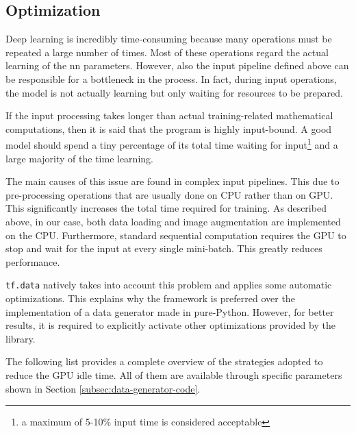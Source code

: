\subsection{Optimization}

Deep learning is incredibly time-consuming because many operations must be repeated a large number of times. Most of these operations regard the actual learning of the \gls{nn} parameters. However, also the input pipeline defined above can be responsible for a bottleneck in the process. In fact, during input operations, the model is not actually learning but only waiting for resources to be prepared.

If the input processing takes longer than actual training-related mathematical computations, then it is said that the program is highly input-bound. A good model should spend a tiny percentage of its total time waiting for input\footnote{a maximum of 5-10\% input time is considered acceptable} and a large majority of the time learning.

\medskip

The main causes of this issue are found in complex input pipelines. This due to pre-processing operations that are usually done on CPU rather than on GPU. This significantly increases the total time required for training. As described above, in our case, both data loading and image augmentation are implemented on the CPU. Furthermore, standard sequential computation requires the GPU to stop and wait for the input at every single mini-batch. This greatly reduces performance.

\texttt{tf.data} natively takes into account this problem and applies some automatic optimizations. This explains why the framework is preferred over the implementation of a data generator made in pure-Python. However, for better results, it is required to explicitly activate other optimizations provided by the library.

The following list provides a complete overview of the strategies adopted to reduce the GPU idle time. All of them are available through specific parameters shown in Section \ref{subsec:data-generator-code}.

